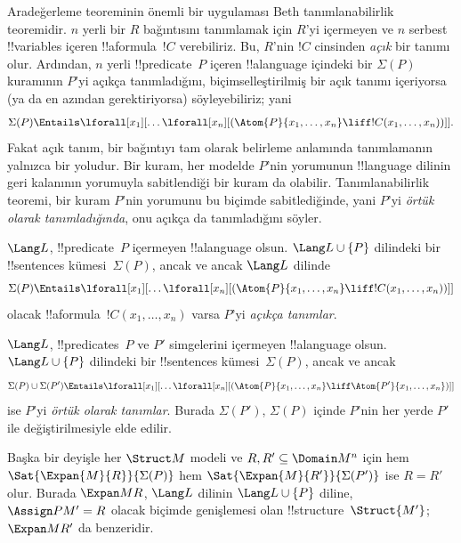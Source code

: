 



Aradeğerleme teoreminin önemli bir uygulaması Beth tanımlanabilirlik
teoremidir. $n$ yerli bir $R$ bağıntısını tanımlamak için $R$'yi
içermeyen ve $n$ serbest !!{variable}s içeren !!a{formula}~$!C$
verebiliriz. Bu, $R$'nin $!C$ cinsinden \emph{açık} bir tanımı olur.
Ardından, $n$ yerli !!{predicate}~$P$ içeren !!a{language} içindeki
bir $\Sigma(P)$ kuramının $P$'yi açıkça tanımladığını, biçimselleştirilmiş
bir açık tanımı içeriyorsa (ya da en azından gerektiriyorsa)
söyleyebiliriz; yani
\[
\Sigma(P) \Entails \lforall[x_1][\dots
  \lforall[x_n][(\Atom{P}{x_1,\dots, x_n} \liff !C(x_1, \dots,
    x_n))]].
\]
Fakat açık tanım, bir bağıntıyı tam olarak belirleme anlamında
tanımlamanın yalnızca bir yoludur. Bir kuram, her modelde $P$'nin
yorumunun !!{language} dilinin geri kalanının yorumuyla sabitlendiği
bir kuram da olabilir. Tanımlanabilirlik teoremi, bir kuram $P$'nin
yorumunu bu biçimde sabitlediğinde, yani $P$'yi \emph{örtük olarak
tanımladığında}, onu açıkça da tanımladığını söyler.

\begin{defn}
$\Lang L$, !!{predicate}~$P$ içermeyen !!a{language} olsun.
$\Lang L\cup\{P\}$ dilindeki bir !!{sentence}s kümesi~$\Sigma(P)$,
ancak ve ancak $\Lang L$ dilinde
\[
\Sigma(P) \Entails \lforall[x_1][\dots
  \lforall[x_n][(\Atom{P}{x_1,\dots, x_n} \liff !C(x_1, \dots,
    x_n))]]
\]
olacak !!a{formula}~$!C(x_1,\dots,x_n)$ varsa $P$'yi
\emph{açıkça tanımlar}.
\end{defn}

\begin{defn}
$\Lang L$, !!{predicate}s~$P$ ve $P'$ simgelerini içermeyen
!!a{language} olsun. $\Lang L\cup\{P\}$ dilindeki bir !!{sentence}s
kümesi~$\Sigma(P)$, ancak ve ancak
\[
\Sigma(P) \cup \Sigma(P') \Entails \lforall[x_1][\dots
  \lforall[x_n][(\Atom{P}{x_1,\dots, x_n} \liff \Atom{P'}{x_1,\dots,
      x_n})]]
\]
ise $P$'yi \emph{örtük olarak tanımlar}. Burada $\Sigma(P')$,
$\Sigma(P)$ içinde $P$'nin her yerde $P'$ ile değiştirilmesiyle elde
edilir.
\end{defn}

Başka bir deyişle her $\Struct M$ modeli ve
$R,R'\subseteq\Domain M^n$ için hem
$\Sat{\Expan{M}{R}}{\Sigma(P)}$ hem
$\Sat{\Expan{M}{R'}}{\Sigma(P')}$ ise $R=R'$ olur. Burada
$\Expan M R$, $\Lang L$ dilinin $\Lang L\cup\{P\}$ diline,
$\Assign P{M'}=R$ olacak biçimde genişlemesi olan
!!{structure}~$\Struct{M'}$; $\Expan M{R'}$ da benzeridir.

